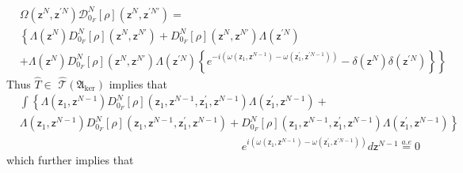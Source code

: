 \documentclass[aps,preprint]{revtex4}%
\begin{document}
\begin{align}
&  \Omega\left(  \mathsf{z}^{N},\mathsf{z}^{\prime N}\right)  \mathcal{D}%
_{0_{F}}^{N}\left[  \rho\right]  \left(  \mathsf{z}^{N},\mathsf{z}^{\prime
N\prime}\right)  =\nonumber\\
&  \left\{  \Lambda\left(  \mathsf{z}^{N}\right)  D_{0_{F}}^{N}\left[
\rho\right]  \left(  \mathsf{z}^{N},\mathsf{z}^{N\prime}\right)  +D_{0_{F}%
}^{N}\left[  \rho\right]  \left(  \mathsf{z}^{N},\mathsf{z}^{N\prime}\right)
\Lambda\left(  \mathsf{z}^{\prime N}\right)  \right. \nonumber\\
&  \left.  +\Lambda\left(  \mathsf{z}^{N}\right)  D_{0_{F}}^{N}\left[
\rho\right]  \left(  \mathsf{z}^{N},\mathsf{z}^{N\prime}\right)
\Lambda\left(  \mathsf{z}^{\prime N}\right)  \left\{  e^{-i\left(
\omega\left(  \mathsf{z}_{1},\mathsf{z}^{N-1}\right)  -\omega\left(
\mathsf{z}_{1}^{\prime},\mathsf{z}^{\prime N-1}\right)  \right)  }%
-\delta\left(  \mathsf{z}^{N}\right)  \delta\left(  \mathsf{z}^{\prime
N}\right)  \right\}  \right\}
\end{align}
Thus $\hat{T}\in$ $\mathcal{\hat{T}}\left(  \mathfrak{A}_{\ker}\right)  $
implies that
\begin{align}
&  \int\left\{  \Lambda\left(  \mathsf{z}_{1},\mathsf{z}^{N-1}\right)
D_{0_{F}}^{N}\left[  \rho\right]  \left(  \mathsf{z}_{1},\mathsf{z}%
^{N-1},\mathsf{z}_{1}^{\prime},\mathsf{z}^{N-1}\right)  \Lambda\left(
\mathsf{z}_{1}^{\prime},\mathsf{z}^{N-1}\right)  +\right. \nonumber\\
&  \left.  \Lambda\left(  \mathsf{z}_{1},\mathsf{z}^{N-1}\right)  D_{0_{F}%
}^{N}\left[  \rho\right]  \left(  \mathsf{z}_{1},\mathsf{z}^{N-1}%
,\mathsf{z}_{1}^{\prime},\mathsf{z}^{N-1}\right)  +D_{0_{F}}^{N}\left[
\rho\right]  \left(  \mathsf{z}_{1},\mathsf{z}^{N-1},\mathsf{z}_{1}^{\prime
},\mathsf{z}^{N-1}\right)  \Lambda\left(  \mathsf{z}_{1}^{\prime}%
,\mathsf{z}^{N-1}\right)  \right\} \nonumber\\
&  \qquad\qquad\qquad\qquad\qquad\qquad\qquad\qquad\qquad\qquad e^{i\left(
\omega\left(  \mathsf{z}_{1},\mathsf{z}^{N-1}\right)  -\omega\left(
\mathsf{z}_{1}^{\prime},\mathsf{z}^{\prime N-1}\right)  \right)  }%
d\mathsf{z}^{N-1}\overset{a.e}{=}0
\end{align}
which further implies that
\end{document}
